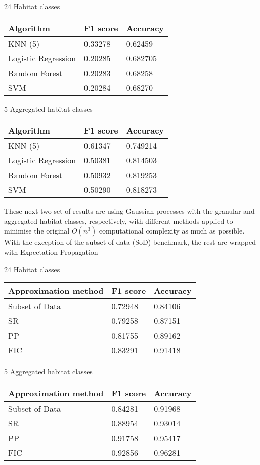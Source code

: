 \documentclass[10pt,sts]{article}
\begin{document}
\begin{multicols}{2}
24 Habitat classes

\begin{tabular}{| l | l | l |}
    \hline
    Algorithm           & F1 score & Accuracy \\\hline
    KNN (5)             & 0.33278 & 0.62459 \\
    Logistic Regression & 0.20285 & 0.682705 \\
    Random Forest       & 0.20283 & 0.68258 \\
    SVM                 & 0.20284 & 0.68270 \\\hline
\end{tabular}

5 Aggregated habitat classes

\begin{tabular}{| l | l | l |}
    \hline
    Algorithm           & F1 score & Accuracy \\\hline
    KNN (5)             & 0.61347 & 0.749214 \\
    Logistic Regression & 0.50381 & 0.814503 \\
    Random Forest       & 0.50932 & 0.819253 \\
    SVM                 & 0.50290 & 0.818273 \\\hline
\end{tabular}

These next two set of results are using Gaussian processes with the granular and aggregated habitat classes, respectively, with different methods applied to minimise the original $O(n^3)$ computational complexity as much as possible. With the exception of the subset of data (SoD) benchmark, the rest are wrapped with Expectation Propagation

24 Habitat classes 

\begin{tabular}{| l | l | l |}
    \hline
    Approximation method    & F1 score & Accuracy \\\hline
    Subset of Data          & 0.72948 & 0.84106 \\
    SR                      & 0.79258 & 0.87151 \\
    PP                      & 0.81755 & 0.89162 \\
    FIC                     & 0.83291 & 0.91418 \\
    \hline
\end{tabular}

5 Aggregated habitat classes

\begin{tabular}{|l | l | l|}
    \hline
    Approximation method    & F1 score & Accuracy \\\hline
    Subset of Data          & 0.84281 & 0.91968 \\
    SR                      & 0.88954 & 0.93014 \\
    PP                      & 0.91758 & 0.95417 \\
    FIC                     & 0.92856 & 0.96281 \\
    \hline
\end{tabular}


\end{multicols}
\end{document}
